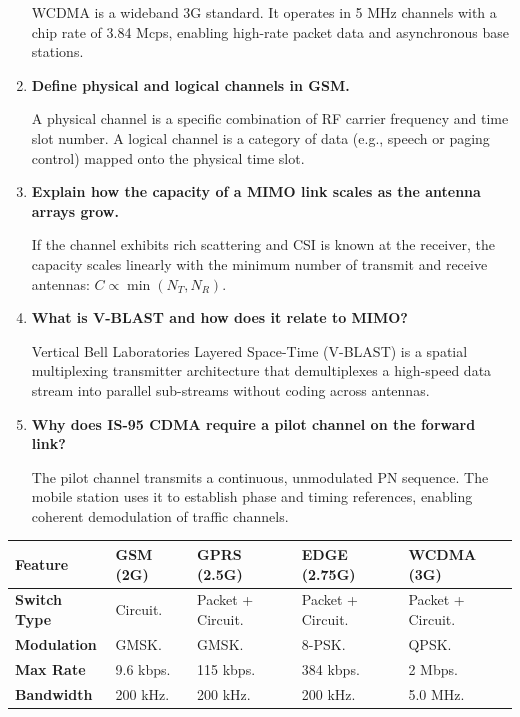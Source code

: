 \documentclass[12pt,a4paper]{article}
\newcommand{\Q}[1]{\textbf{#1}\par\noindent\ignorespaces}
\renewcommand{\arraystretch}{1.45}
\begin{document}
\begin{tcolorbox}[exambox, title={\textbf{Frequently Asked / Viva Questions}}]
\begin{enumerate}[topsep=0pt, label=\textbf{Q\arabic*.}, itemsep=5pt]
    WCDMA is a wideband 3G standard. It operates in 5 MHz channels with a chip rate of 3.84 Mcps, enabling high-rate packet data and asynchronous base stations.
  \item \Q{Define physical and logical channels in GSM.}
    A physical channel is a specific combination of RF carrier frequency and time slot number. A logical channel is a category of data (e.g., speech or paging control) mapped onto the physical time slot.
  \item \Q{Explain how the capacity of a MIMO link scales as the antenna arrays grow.}
    If the channel exhibits rich scattering and CSI is known at the receiver, the capacity scales linearly with the minimum number of transmit and receive antennas: $C \propto \min(N_T, N_R)$.
  \item \Q{What is V-BLAST and how does it relate to MIMO?}
    Vertical Bell Laboratories Layered Space-Time (V-BLAST) is a spatial multiplexing transmitter architecture that demultiplexes a high-speed data stream into parallel sub-streams without coding across antennas.
  \item \Q{Why does IS-95 CDMA require a pilot channel on the forward link?}
    The pilot channel transmits a continuous, unmodulated PN sequence. The mobile station uses it to establish phase and timing references, enabling coherent demodulation of traffic channels.
\end{enumerate}
\end{tcolorbox}

\begin{tcolorbox}[tikzbox, title={Comparison of 2G, 2.5G, 2.75G, and 3G Systems}]
\renewcommand{\arraystretch}{1.4}
\par\noindent
{\renewcommand{\arraystretch}{1.55}%
\begin{tabularx}{\linewidth}{|B{2.8cm}|Y|Y|Y|Y|}\hline
\textbf{Feature} & \textbf{GSM (2G)} & \textbf{GPRS (2.5G)} & \textbf{EDGE (2.75G)} & \textbf{WCDMA (3G)} \\[4pt]
\hline
\textbf{Switch Type} & Circuit. & Packet + Circuit. & Packet + Circuit. & Packet + Circuit. \\
\hline
\textbf{Modulation} & GMSK. & GMSK. & 8-PSK. & QPSK. \\
\hline
\textbf{Max Rate} & 9.6 kbps. & 115 kbps. & 384 kbps. & 2 Mbps. \\
\hline
\textbf{Bandwidth} & 200 kHz. & 200 kHz. & 200 kHz. & 5.0 MHz. \\
\hline
\end{tabularx}
}
\end{tcolorbox}
\end{document}
